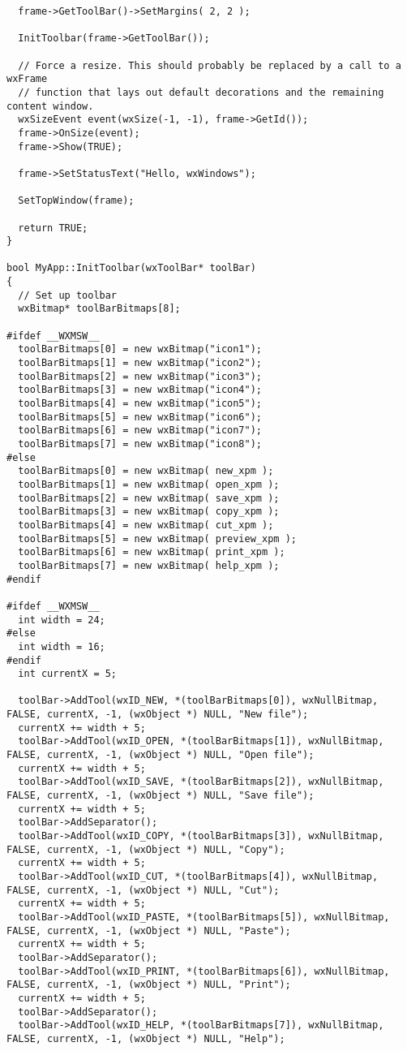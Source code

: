 {\begin{verbatim}
  frame->GetToolBar()->SetMargins( 2, 2 );

  InitToolbar(frame->GetToolBar());

  // Force a resize. This should probably be replaced by a call to a wxFrame
  // function that lays out default decorations and the remaining content window.
  wxSizeEvent event(wxSize(-1, -1), frame->GetId());
  frame->OnSize(event);
  frame->Show(TRUE);

  frame->SetStatusText("Hello, wxWindows");
  
  SetTopWindow(frame);

  return TRUE;
}

bool MyApp::InitToolbar(wxToolBar* toolBar)
{
  // Set up toolbar
  wxBitmap* toolBarBitmaps[8];

#ifdef __WXMSW__
  toolBarBitmaps[0] = new wxBitmap("icon1");
  toolBarBitmaps[1] = new wxBitmap("icon2");
  toolBarBitmaps[2] = new wxBitmap("icon3");
  toolBarBitmaps[3] = new wxBitmap("icon4");
  toolBarBitmaps[4] = new wxBitmap("icon5");
  toolBarBitmaps[5] = new wxBitmap("icon6");
  toolBarBitmaps[6] = new wxBitmap("icon7");
  toolBarBitmaps[7] = new wxBitmap("icon8");
#else
  toolBarBitmaps[0] = new wxBitmap( new_xpm );
  toolBarBitmaps[1] = new wxBitmap( open_xpm );
  toolBarBitmaps[2] = new wxBitmap( save_xpm );
  toolBarBitmaps[3] = new wxBitmap( copy_xpm );
  toolBarBitmaps[4] = new wxBitmap( cut_xpm );
  toolBarBitmaps[5] = new wxBitmap( preview_xpm );
  toolBarBitmaps[6] = new wxBitmap( print_xpm );
  toolBarBitmaps[7] = new wxBitmap( help_xpm );
#endif

#ifdef __WXMSW__
  int width = 24;
#else
  int width = 16;
#endif
  int currentX = 5;

  toolBar->AddTool(wxID_NEW, *(toolBarBitmaps[0]), wxNullBitmap, FALSE, currentX, -1, (wxObject *) NULL, "New file");
  currentX += width + 5;
  toolBar->AddTool(wxID_OPEN, *(toolBarBitmaps[1]), wxNullBitmap, FALSE, currentX, -1, (wxObject *) NULL, "Open file");
  currentX += width + 5;
  toolBar->AddTool(wxID_SAVE, *(toolBarBitmaps[2]), wxNullBitmap, FALSE, currentX, -1, (wxObject *) NULL, "Save file");
  currentX += width + 5;
  toolBar->AddSeparator();
  toolBar->AddTool(wxID_COPY, *(toolBarBitmaps[3]), wxNullBitmap, FALSE, currentX, -1, (wxObject *) NULL, "Copy");
  currentX += width + 5;
  toolBar->AddTool(wxID_CUT, *(toolBarBitmaps[4]), wxNullBitmap, FALSE, currentX, -1, (wxObject *) NULL, "Cut");
  currentX += width + 5;
  toolBar->AddTool(wxID_PASTE, *(toolBarBitmaps[5]), wxNullBitmap, FALSE, currentX, -1, (wxObject *) NULL, "Paste");
  currentX += width + 5;
  toolBar->AddSeparator();
  toolBar->AddTool(wxID_PRINT, *(toolBarBitmaps[6]), wxNullBitmap, FALSE, currentX, -1, (wxObject *) NULL, "Print");
  currentX += width + 5;
  toolBar->AddSeparator();
  toolBar->AddTool(wxID_HELP, *(toolBarBitmaps[7]), wxNullBitmap, FALSE, currentX, -1, (wxObject *) NULL, "Help");


\end{verbatim}}
